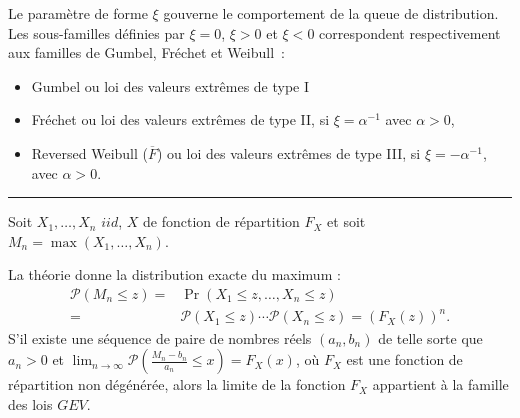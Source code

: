 \begin{f}

Le paramètre de forme $\xi$ gouverne le comportement de la queue de distribution. 
Les sous-familles définies par $\xi= 0$, $\xi>0$ et $\xi<0$ correspondent respectivement aux familles de Gumbel, Fréchet et Weibull~:
\begin{itemize}
\item 	 Gumbel ou loi des valeurs extrêmes de type I
\item     Fréchet ou loi des valeurs extrêmes de type II, si $\xi  = \alpha^{-1}$ avec $\alpha>0$,
\item    Reversed Weibull ($\overline{F}$) ou loi des valeurs extrêmes de type III, si $\xi =-\alpha^{-1} $, avec $\alpha>0$.
\end{itemize}
\end{f}
\hrule 

\begin{f} 

	Soit $X_1, \dots, X_n$  $iid$, $X$ de fonction de répartition $F_X$ et soit $M_n =\max(X_1,\dots,X_n)$.
	
	La théorie donne la distribution exacte du maximum :
\begin{align*}
		\mathcal{P}(M_n \leq z) = &\Pr(X_1 \leq z, \dots, X_n \leq z) \\
		 = &\mathcal{P}(X_1 \leq z) \cdots \mathcal{P}(X_n \leq z) = (F_X(z))^n. 
\end{align*}
	S'il existe une séquence de paire de nombres réels $(a_n, b_n)$ de telle sorte que $a_n>0$ et $\lim_{n \to \infty}\mathcal{P}\left(\frac{M_n-b_n}{a_n}\leq x\right) = F_X(x)$, où $F_X$ est une fonction de répartition non dégénérée, alors la limite de la fonction $F_X$ appartient à la famille des lois $GEV$. 

\end{f}


